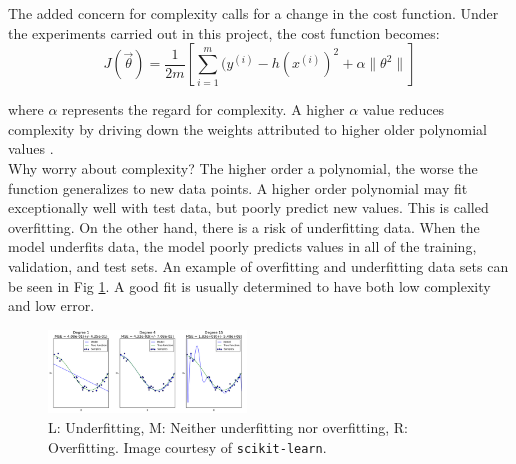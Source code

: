 The added concern for complexity calls for a change in the cost function. Under the
experiments carried out in this project, the cost function becomes: 
$$J(\vec{\theta}) = \frac{1}{2m} [\sum_{i = 1}^{m} (y^{(i)} - h(x^{(i)})^2 + \alpha \| \theta ^ 2 \|]$$

where $\alpha$ represents the regard for complexity. A higher $\alpha$ value
reduces complexity by driving down the weights attributed to higher older polynomial
values \cite{scikit}. \\ 

Why worry about complexity? The higher order a polynomial, the worse the 
function generalizes to new data points. A higher order polynomial may fit
exceptionally well with test data, but poorly predict new values. This is called
overfitting. On the other hand, there is a risk of underfitting data. When the model
underfits data, the model poorly predicts values in all of the training, validation, and test sets.
An example of overfitting and underfitting data sets can be seen in Fig \ref{fig:fitting}. A good fit is usually determined to have both low complexity and low error. 

\begin{figure}[htb]

  \centering  %

  \includegraphics[width=0.47\textwidth]{figs/fitting.png}

  \caption{L: Underfitting, M: Neither underfitting nor overfitting,
  		R: Overfitting. Image courtesy of \texttt{scikit-learn}.}

  \label{fig:fitting}

\end{figure}

